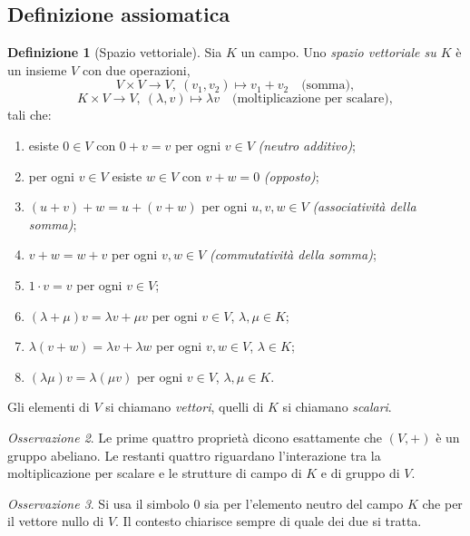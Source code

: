 \documentclass[11pt, a4paper]{book}
\theoremstyle{definition}
\newtheorem{definizione}{Definizione}[section]
\theoremstyle{plain}
\theoremstyle{remark}
\newtheorem{osservazione}[definizione]{Osservazione}
\begin{document}
\subsection{Definizione assiomatica}

\begin{defbox}
\begin{definizione}[Spazio vettoriale]
\label{def:spaziovett}
Sia $K$ un campo. Uno \emph{spazio vettoriale su $K$} è un insieme $V$ con due operazioni,
\[
  V \times V \to V,\ (v_1,v_2) \mapsto v_1 + v_2 \quad \text{(somma)},
\]
\[
  K \times V \to V,\ (\lambda,v) \mapsto \lambda v \quad \text{(moltiplicazione per scalare)},
\]
tali che:
\begin{enumerate}
  \item esiste $0 \in V$ con $0 + v = v$ per ogni $v \in V$ \emph{(neutro additivo)};
  \item per ogni $v \in V$ esiste $w \in V$ con $v + w = 0$ \emph{(opposto)};
  \item $(u+v)+w = u+(v+w)$ per ogni $u,v,w \in V$ \emph{(associatività della somma)};
  \item $v + w = w + v$ per ogni $v,w \in V$ \emph{(commutatività della somma)};
  \item $1 \cdot v = v$ per ogni $v \in V$;
  \item $(\lambda+\mu)v = \lambda v + \mu v$ per ogni $v \in V$, $\lambda,\mu \in K$;
  \item $\lambda(v+w) = \lambda v + \lambda w$ per ogni $v,w \in V$, $\lambda \in K$;
  \item $(\lambda\mu)v = \lambda(\mu v)$ per ogni $v \in V$, $\lambda,\mu \in K$.
\end{enumerate}
Gli elementi di $V$ si chiamano \emph{vettori}, quelli di $K$ si chiamano \emph{scalari}.
\end{definizione}
\end{defbox}

\begin{osservazione}
Le prime quattro proprietà dicono esattamente che $(V,+)$ è un gruppo abeliano. Le restanti quattro riguardano l'interazione tra la moltiplicazione per scalare e le strutture di campo di $K$ e di gruppo di $V$.
\end{osservazione}

\begin{osservazione}
Si usa il simbolo $0$ sia per l'elemento neutro del campo $K$ che per il vettore nullo di $V$. Il contesto chiarisce sempre di quale dei due si tratta.
\end{osservazione}
\end{document}
